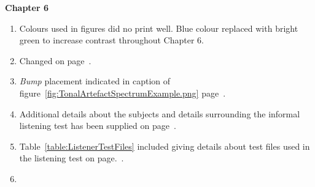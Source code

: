 \textbf{Chapter 6}
\begin{enumerate}
\item Colours used in figures did no print well. Blue colour replaced with bright green to increase contrast throughout Chapter 6.
\item Changed on page~\pageref{eq:RestBasicModel}.
\item \emph{Bump} placement indicated in caption of figure~\ref{fig:TonalArtefactSpectrumExample.png} page~\pageref{fig:TonalArtefactSpectrumExample.png}.
\item Additional details about the subjects and details surrounding the informal listening test has been supplied on page~\pageref{corrections:subjects}.
\item Table~\ref{table:ListenerTestFiles} included giving details about test files used in the listening test on page.~\pageref{table:ListenerTestFiles}.
\item 
\end{enumerate}